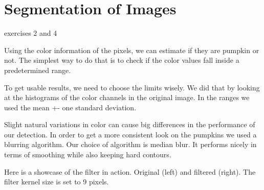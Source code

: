\documentclass[../Head/Main.tex]{subfiles}
\begin{document}
\section{Segmentation of Images}
exercises 2 and 4

Using the color information of the pixels, we can estimate if they are pumpkin or not.
The simplest way to do that is to check if the color values fall inside a predetermined range.

To get usable results, we need to choose the limits wisely.
We did that by looking at the histograms of the color channels in the original image.
In the ranges we used the mean +- one standard deviation.

Slight natural variations in color can cause big differences in the performance of our detection.
In order to get a more consistent look on the pumpkins we used a blurring algorithm.
Our choice of algorithm is median blur. It performs nicely in terms of smoothing while also keeping hard contours.

Here is a showcase of the filter in action. Original (left) and filtered (right). The filter kernel size is set to 9 pixels.

\end{document}
